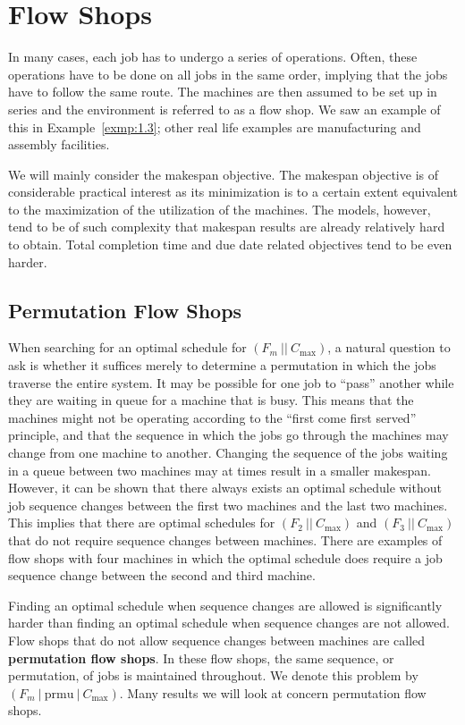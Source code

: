 \section{Flow Shops} \label{sec:7}
In many cases, each job has to undergo a series of operations. 
Often, these operations have to be done on all jobs in the same
order, implying that the jobs have to follow the same route.
The machines are then assumed to be set up in series and the environment 
is referred to as a flow shop. We saw an example of this in 
Example~\ref{exmp:1.3}; other real life examples are manufacturing and 
assembly facilities. 

We will mainly consider the makespan objective. The makespan objective is of 
considerable practical interest as its minimization is to a certain extent 
equivalent to the maximization of the utilization of the
machines. The models, however, tend to be of such complexity that makespan
results are already relatively hard to obtain. Total completion time and due
date related objectives tend to be even harder.

\subsection{Permutation Flow Shops} \label{subsec:7.1}
When searching for an optimal schedule for $(F_m~||~C_{\max})$, 
a natural question to ask is whether it suffices merely to determine 
a permutation in which the jobs traverse the entire system. 
It may be possible for one job to ``pass'' another while they are 
waiting in queue for a machine that is busy. This means that the 
machines might not be operating according to the ``first come first 
served'' principle, and that the sequence in which the jobs go through the 
machines may change from one machine to another. Changing the sequence of the 
jobs waiting in a queue between two machines may at times result in a smaller 
makespan. However, it can be shown that there always exists an optimal 
schedule without job sequence changes between the first two machines 
and the last two machines. This implies that there are optimal schedules for 
$(F_2~||~C_{\max})$ and $(F_3~||~C_{\max})$ that do not require 
sequence changes between machines. There are examples of flow shops with 
four machines in which the optimal schedule does require a job sequence 
change between the second and third machine. 

Finding an optimal schedule when sequence changes are allowed is significantly
harder than finding an optimal schedule when sequence changes are not
allowed. Flow shops that do not allow sequence changes between machines are
called {\bf permutation flow shops}. In these flow shops, the same sequence, 
or permutation, of jobs is maintained throughout. We denote this 
problem by $(F_m~|~\text{prmu}~|~C_{\max})$. Many results we will
look at concern permutation flow shops. 

